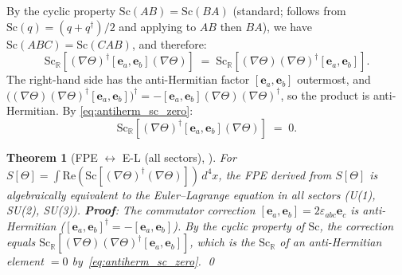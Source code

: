 \documentclass[12pt,a4paper]{article}
\newtheorem{theorem}{Theorem}[section]
\theoremstyle{definition}
\theoremstyle{remark}
\begin{document}
By the cyclic property $\mathrm{Sc}(AB) = \mathrm{Sc}(BA)$ (standard; follows from
$\mathrm{Sc}(q) = (q + q^\dagger)/2$ and applying to $AB$ then $BA$), we have
$\mathrm{Sc}(ABC) = \mathrm{Sc}(CAB)$, and therefore:
\begin{equation}
  \mathrm{Sc}_\mathbb{R}\!\left[(\nabla\Theta)^\dagger [\mathbf{e}_a,\mathbf{e}_b] (\nabla\Theta)\right]
  \;=\; \mathrm{Sc}_\mathbb{R}\!\left[(\nabla\Theta)(\nabla\Theta)^\dagger [\mathbf{e}_a,\mathbf{e}_b]\right].
  \label{eq:correction_cyclic}
\end{equation}
The right-hand side has the anti-Hermitian factor $[\mathbf{e}_a,\mathbf{e}_b]$ outermost, and
$\bigl((\nabla\Theta)(\nabla\Theta)^\dagger[\mathbf{e}_a,\mathbf{e}_b]\bigr)^\dagger
= -[\mathbf{e}_a,\mathbf{e}_b](\nabla\Theta)(\nabla\Theta)^\dagger$,
so the product is anti-Hermitian.
By \eqref{eq:antiherm_sc_zero}:
\begin{equation}
  \mathrm{Sc}_\mathbb{R}\!\left[(\nabla\Theta)^\dagger [\mathbf{e}_a,\mathbf{e}_b] (\nabla\Theta)\right]
  \;=\; 0.
  \label{eq:correction_vanishes}
\end{equation}

\begin{theorem}[FPE $\leftrightarrow$ E-L (all sectors), \Lzero]
\label{thm:fpe_all_sectors}
For $S[\Theta] = \int \mathrm{Re}(\mathrm{Sc}[(\nabla\Theta)^\dagger(\nabla\Theta)])\,d^4x$,
the FPE derived from $S[\Theta]$ is algebraically equivalent to the
Euler--Lagrange equation in all sectors (U(1), SU(2), SU(3)).
\textbf{Proof}: The commutator correction $[\mathbf{e}_a,\mathbf{e}_b]
= 2\varepsilon_{abc}\mathbf{e}_c$ is anti-Hermitian ($[\mathbf{e}_a,\mathbf{e}_b]^\dagger
= -[\mathbf{e}_a,\mathbf{e}_b]$).
By the cyclic property of $\mathrm{Sc}$, the correction equals
$\mathrm{Sc}_\mathbb{R}[(\nabla\Theta)(\nabla\Theta)^\dagger[\mathbf{e}_a,\mathbf{e}_b]]$,
which is the $\mathrm{Sc}_\mathbb{R}$ of an anti-Hermitian element $= 0$
by~\eqref{eq:antiherm_sc_zero}.
\qed
\end{theorem}
\end{document}
